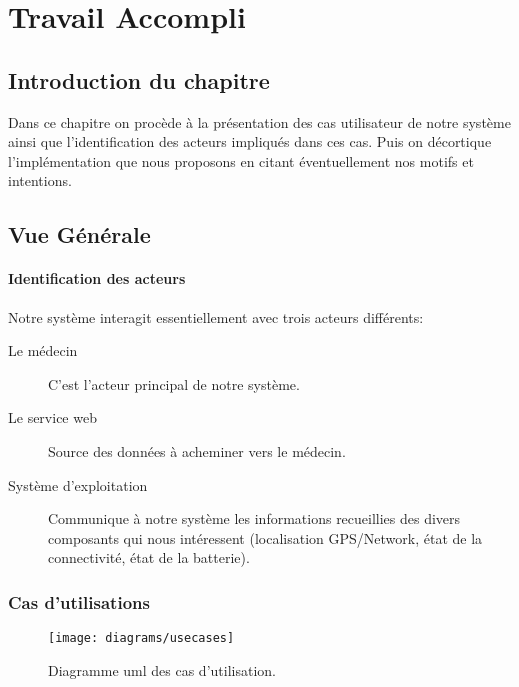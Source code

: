 
\chapter{Travail Accompli}

\section{Introduction du chapitre}

Dans ce chapitre on procède à la présentation des cas utilisateur de
notre système ainsi que l'identification des acteurs impliqués dans ces
cas. Puis on décortique l’implémentation que nous proposons en citant
éventuellement nos motifs et intentions.

\section{Vue Générale}
\subsubsection{Identification des acteurs}

Notre système interagit essentiellement avec trois acteurs différents:

\begin{description}
\item[Le médecin] C'est l'acteur principal de notre système.

\item[Le service web] Source des données à acheminer vers le médecin.

\item[Système d'exploitation] Communique à notre système les
informations recueillies des divers composants qui nous intéressent
(localisation GPS/Network, état de la connectivité, état de la
batterie).

\end{description}

\subsection{Cas d'utilisations}

\begin{figure}
\center
\texttt{[image: diagrams/usecases]}
\caption{Diagramme \gls{uml} des cas d'utilisation.}
\label{fig:usecase}
\end{figure}

